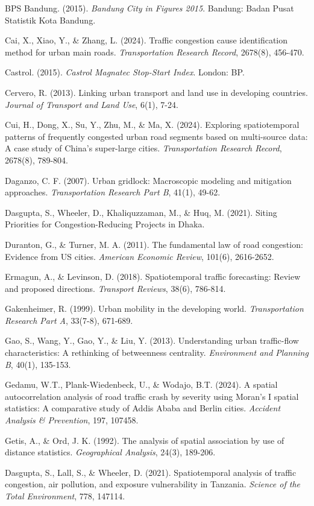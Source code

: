 \documentclass[12pt,a4paper]{article}
\begin{document}
BPS Bandung. (2015). \emph{Bandung City in Figures 2015}. Bandung: Badan Pusat Statistik Kota Bandung.

Cai, X., Xiao, Y., \& Zhang, L. (2024). Traffic congestion cause identification method for urban main roads. \emph{Transportation Research Record}, 2678(8), 456-470.

Castrol. (2015). \emph{Castrol Magnatec Stop-Start Index}. London: BP.

Cervero, R. (2013). Linking urban transport and land use in developing countries. \emph{Journal of Transport and Land Use}, 6(1), 7-24.

Cui, H., Dong, X., Su, Y., Zhu, M., \& Ma, X. (2024). Exploring spatiotemporal patterns of frequently congested urban road segments based on multi-source data: A case study of China's super-large cities. \emph{Transportation Research Record}, 2678(8), 789-804.

Daganzo, C. F. (2007). Urban gridlock: Macroscopic modeling and mitigation approaches. \emph{Transportation Research Part B}, 41(1), 49-62.

Dasgupta, S., Wheeler, D., Khaliquzzaman, M., \& Huq, M. (2021). Siting Priorities for Congestion-Reducing Projects in Dhaka.

Duranton, G., \& Turner, M. A. (2011). The fundamental law of road congestion: Evidence from US cities. \emph{American Economic Review}, 101(6), 2616-2652.

Ermagun, A., \& Levinson, D. (2018). Spatiotemporal traffic forecasting: Review and proposed directions. \emph{Transport Reviews}, 38(6), 786-814.

Gakenheimer, R. (1999). Urban mobility in the developing world. \emph{Transportation Research Part A}, 33(7-8), 671-689.

Gao, S., Wang, Y., Gao, Y., \& Liu, Y. (2013). Understanding urban traffic-flow characteristics: A rethinking of betweenness centrality. \emph{Environment and Planning B}, 40(1), 135-153.

Gedamu, W.T., Plank-Wiedenbeck, U., \& Wodajo, B.T. (2024). A spatial autocorrelation analysis of road traffic crash by severity using Moran's I spatial statistics: A comparative study of Addis Ababa and Berlin cities. \emph{Accident Analysis \& Prevention}, 197, 107458.

Getis, A., \& Ord, J. K. (1992). The analysis of spatial association by use of distance statistics. \emph{Geographical Analysis}, 24(3), 189-206.

Dasgupta, S., Lall, S., \& Wheeler, D. (2021). Spatiotemporal analysis of traffic congestion, air pollution, and exposure vulnerability in Tanzania. \emph{Science of the Total Environment}, 778, 147114.
\end{document}
